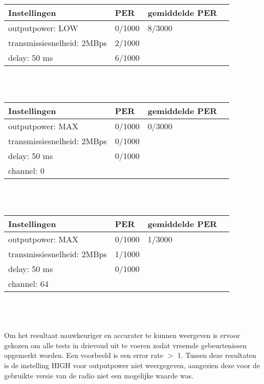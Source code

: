 \documentclass{article}
\begin{document}
    \begin{tabular}{ | l | l | l | p{5cm} |}
    \hline
    Instellingen				& PER 		& gemiddelde PER\\ \hline
    outputpower: LOW 			& 0/1000 	& 8/3000		\\ 
    transmissiesnelheid: 2MBps 	& 2/1000 	&   			\\ 
    delay: 50 ms 				& 6/1000 	&  				\\ \hline
    \end{tabular}\\
    \\
    
    \begin{tabular}{ | l | l | l | p{5cm} |}
    \hline
    Instellingen				& PER 		& gemiddelde PER\\ \hline
    outputpower: MAX 			& 0/1000 	&  0/3000		\\ 
    transmissiesnelheid: 2MBps 	& 0/1000 	&   			\\ 
    delay: 50 ms 				& 0/1000 	&				\\ 
    channel: 0 					&  			&  				\\ \hline
    \end{tabular}\\
    \\
    
    \begin{tabular}{ | l | l | l | p{5cm} |}
    \hline
    Instellingen				& PER 		& gemiddelde PER\\ \hline
    outputpower: MAX 			& 0/1000 	& 1/3000		\\ 
    transmissiesnelheid: 2MBps 	& 1/1000 	&  				\\ 
    delay: 50 ms 				& 0/1000 	&  				\\ 
    channel: 64 				&  			&				\\ \hline
    \end{tabular}\\
\\
\\
Om het resultaat nauwkeuriger en accurater te kunnen weergeven is ervoor gekozen om alle tests in drievoud uit te voeren zodat vreemde gebeurtenissen opgemerkt worden. Een voorbeeld is een error rate $>$ 1. Tussen deze resultaten is de instelling HIGH voor outputpower niet weergegeven, aangezien deze voor de gebruikte versie van de radio niet een mogelijke waarde was.
\end{document}
